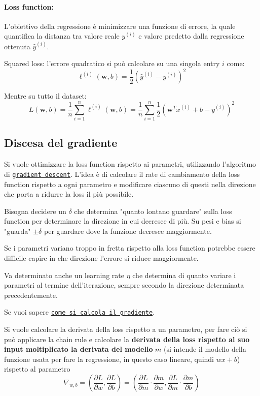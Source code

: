 \paragraph{Loss function:} L'obiettivo della regressione è minimizzare una funzione di errore, la quale quantifica la distanza tra valore reale $y^{(i)}$ e valore predetto dalla regressione ottenuta $\hat y^{(i)}$.

Squared loss: l'errore quadratico si può calcolare su una singola entry $i$ come:
$$ \ell^{(i)}(\bm w, b) = \frac{1}{2}  \left(\hat y^{(i)} - y^{(i)}\right)^2 $$

Mentre su tutto il dataset:
$$ L (\bm w, b) = \frac{1}{n} \sum_{i=1}^{n} \ell^{(i)} (\bm w, b) = \frac{1}{n} \sum_{i=1}^{n} \frac{1}{2} \left(\bm w^T x^{(i)} + b - y^{(i)} \right)^2 $$


\subsection{Discesa del gradiente}

Si vuole ottimizzare la loss function rispetto ai parametri, utilizzando l'algoritmo di \href{https://it.wikipedia.org/wiki/Discesa_del_gradiente}{\texttt{gradient descent}}. L'idea è di calcolare il rate di cambiamento della loss function rispetto a ogni parametro e modificare ciascuno di questi nella direzione che porta a ridurre la loss il più possibile.

Bisogna decidere un $\delta$ che determina "quanto lontano guardare" sulla loss function per determinare la direzione in cui decresce di più. Su pesi e bias si "guarda" $\pm \delta$ per guardare dove la funzione decresce maggiormente.

Se i parametri variano troppo in fretta rispetto alla loss function potrebbe essere difficile capire in che direzione l'errore si riduce maggiormente.

Va determinato anche un learning rate $\eta$ che determina di quanto variare i parametri al termine dell'iterazione, sempre secondo la direzione determinata precedentemente.

Se vuoi sapere \href{https://it.wikipedia.org/wiki/Gradiente}{\texttt{come si calcola il gradiente}}.

Si vuole calcolare la derivata della loss rispetto a un parametro, per fare ciò si può applicare la chain rule e calcolare la \textbf{derivata della loss rispetto al suo input moltiplicato la derivata del modello} $m$ (si intende il modello della funzione usata per fare la regressione, in questo caso lineare, quindi $wx + b$) rispetto al parametro
$$ \nabla_{w,b} = \left( \frac{\partial L}{\partial w}, \frac{\partial L}{\partial b}\right) = \left(\frac{\partial L}{\partial m} \cdot \frac{\partial m}{\partial w}, \frac{\partial L}{\partial m} \cdot \frac{\partial m}{\partial b}\right) $$

